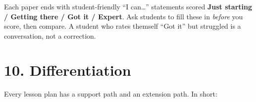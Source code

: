 \documentclass[level=3,teacher]{kidscode}
\begin{document}
\begin{teachernote}
Each paper ends with student-friendly \enquote{I can\ldots} statements scored
\textbf{Just starting / Getting there / Got it / Expert}. Ask students to fill these in
\emph{before} you score, then compare. A student who rates themself \enquote{Got it} but struggled
is a conversation, not a correction.
\end{teachernote}

\section{10. Differentiation}

Every lesson plan has a support path and an extension path. In short:
\end{document}
